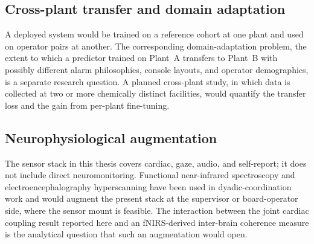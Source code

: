\subsection{Cross-plant transfer and domain adaptation}

A deployed system would be trained on a reference cohort at one plant and used on operator pairs at another. The corresponding domain-adaptation problem, the extent to which a predictor trained on Plant~A transfers to Plant~B with possibly different alarm philosophies, console layouts, and operator demographics, is a separate research question. A planned cross-plant study, in which data is collected at two or more chemically distinct facilities, would quantify the transfer loss and the gain from per-plant fine-tuning.

\subsection{Neurophysiological augmentation}

The sensor stack in this thesis covers cardiac, gaze, audio, and self-report; it does not include direct neuromonitoring. Functional near-infrared spectroscopy and electroencephalography hyperscanning have been used in dyadic-coordination work \cite{cui2012nirs,dumas2010interbrain,czeszumski2020hyperscanning} and would augment the present stack at the supervisor or board-operator side, where the sensor mount is feasible. The interaction between the joint cardiac coupling result reported here and an fNIRS-derived inter-brain coherence measure is the analytical question that such an augmentation would open.


